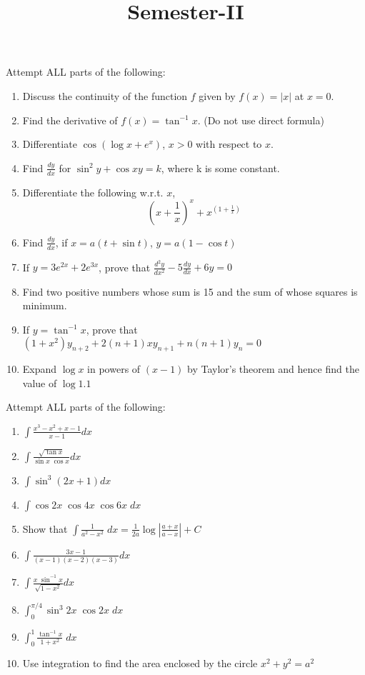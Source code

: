 \documentclass[12pt]{article}
\title{Semester-II}
\begin{document}
 
\begin{questions}
	\question Attempt ALL parts of the following: 
	\begin{enumerate}
	\item Discuss the continuity of the function $f$ given by $f(x) = |x|$ at $x=0$.
	\item Find the derivative of $ \displaystyle  f(x) = \tan^{-1} x$. (Do not use direct formula)
	\item Differentiate $ \displaystyle \cos (\log x + e^x )$, $x>0$ with respect to $x$.
	\item Find $ \displaystyle \frac{dy}{dx}$ for $\displaystyle \sin^2 y + \cos xy =k$, where k is some constant.
	\item Differentiate the following w.r.t. $x$,
	\[\left(x + \frac{1}{x}\right)^x + x^{\left(1 + \frac{1}{x}\right)}\]
	\item Find $\displaystyle \frac{dy}{dx}$, if $x = a(t + \sin t)$, $y=a(1-\cos t)$
	\item If $y=3e^{2x} + 2e^{3x}$, prove that $\displaystyle \frac{d^2y}{dx^2} - 5 \frac{dy}{dx} + 6y = 0$
	\item Find two positive numbers whose sum is 15 and the sum of whose squares is minimum.
	\item If $y=\tan^{-1} x$, prove that $(1+x^2)y_{n+2} + 2(n+1) x y_{n+1} + n(n+1)y_{n} = 0$
\item Expand $\log x$ in powers of $(x-1)$ by Taylor's theorem and hence find the value of $\log 1.1$	
	\end{enumerate}
\item Attempt ALL parts of the following: 
\begin{enumerate}
\item $ \displaystyle \int{\frac{x^3-x^2+x-1}{x-1}} dx$
\item $ \displaystyle \int{\frac{\sqrt{\tan x}}{\sin x \; \cos x}} dx$
\item $ \displaystyle \int{\sin^3 (2x+1)} dx$
\item $ \displaystyle \int{\cos 2x \;\cos 4x \;\cos 6x}\; dx$
\newpage
\item Show that
$ \displaystyle \int{\frac{1}{a^2 - x^2}}\;dx = \frac{1}{2a } \log \left|\frac{a+x}{a-x}\right| + C$
\item $ \displaystyle \int{\frac{3x-1}{(x-1)(x-2)(x-3)}} dx$
\item $ \displaystyle \int{\frac{x\; \sin^{-1} x}{\sqrt{1-x^2}}} dx$
\item $ \displaystyle \int_{0}^{\pi /4}{\sin^3 2x \;\cos 2x }\; dx$
\item $ \displaystyle \int_{0}^{1}{\frac{\tan^{-1} x} {1+x^2}}\; dx$
\item Use integration to find the area enclosed by the circle $x^2 + y^2 = a^2$
\end{enumerate}
\end{questions}
\end{document}
